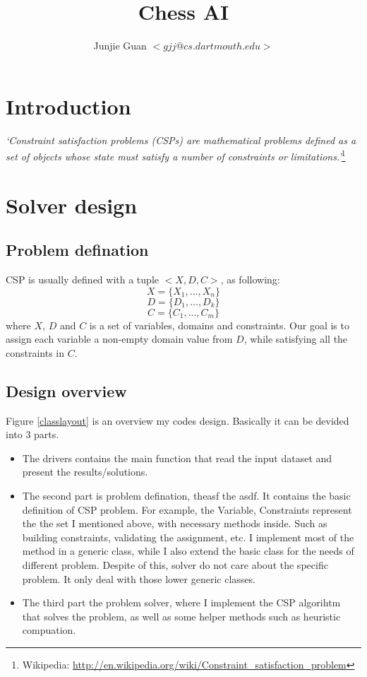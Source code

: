 \documentclass{article}
\title{Chess AI}
\author{Junjie Guan $<gjj@cs.dartmouth.edu>$}
\begin{document}
\maketitle

\tableofcontents

\section{Introduction}

\emph{`Constraint satisfaction problems (CSPs) are mathematical problems defined as a set of objects whose state must satisfy a number of constraints or limitations.'}\footnote{Wikipedia: \url{http://en.wikipedia.org/wiki/Constraint_satisfaction_problem}}













\clearpage
\section{Solver design}
\subsection{Problem defination}
CSP is usually defined  with a tuple $<X, D, C>$, as following:
$$X = \{X_1, ..., X_n\}$$
$$D = \{D_1, ..., D_k\}$$
$$C = \{C_1, ..., C_m\}$$
where  $X$, $D$ and $C$ is a set of variables, domains and constraints. Our goal is to assign each variable a non-empty domain value from $D$, while satisfying all the constraints in $C$.

\subsection{Design overview}
Figure \ref{classlayout} is an overview my codes design. Basically it can be devided into 3 parts.  

\begin{itemize}
  \item The drivers contains the main function that read the input dataset and present the results/solutions.
  \item  The second part is problem defination, theasf the asdf. It contains the basic definition of CSP problem. For example, the Variable, Constraints represent the the set I mentioned above, with necessary methods inside. Such as building constraints, validating the assignment, etc. I implement most of the method in a generic class, while I also extend the basic class for the needs of different problem. Despite of this, solver do not care about the specific problem. It only deal with those lower generic classes.
  \item The third part the problem solver, where I implement the CSP algorihtm that solves the problem, as well as some helper methods such as heuristic compuation.
\end{itemize}
\end{document}
